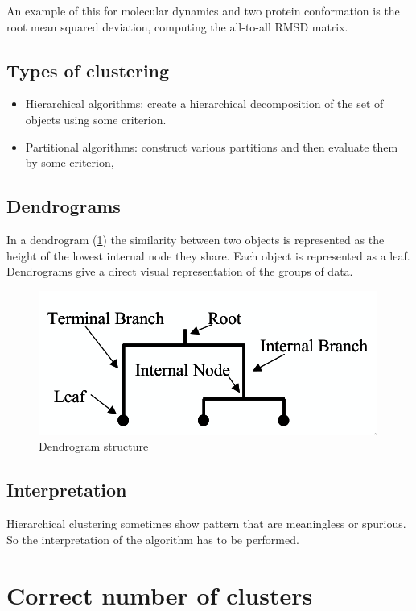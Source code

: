 	An example of this for molecular dynamics and two protein conformation is the root mean squared deviation, computing the all-to-all RMSD matrix.

	\subsection{Types of clustering}

	\begin{itemize}
		\item Hierarchical algorithms: create a hierarchical decomposition of the set of objects using some criterion.
		\item Partitional algorithms: construct various partitions and then evaluate them by some criterion,
	\end{itemize}

	\subsection{Dendrograms}
	In a dendrogram (\ref{fig:dendrogram}) the similarity between two objects is represented as the height of the lowest internal node they share.
	Each object is represented as a leaf.
	Dendrograms give a direct visual representation of the groups of data.

	\begin{figure}[H]
		\includegraphics[width=\textwidth]{dendrogram}
		\caption{Dendrogram structure}
		\label{fig:dendrogram}
	\end{figure}

		\subsection{Interpretation}
		Hierarchical clustering sometimes show pattern that are meaningless or spurious.
		So the interpretation of the algorithm has to be performed.

\section{Correct number of clusters}

